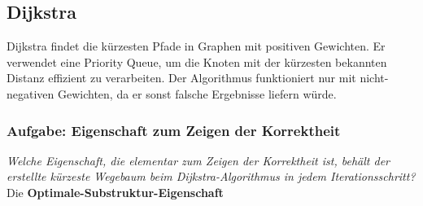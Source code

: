 \documentclass{article}
\begin{document}
\subsection{Dijkstra}
\begin{algo}[title=Dijkstra Algorithmus]
Dijkstra findet die kürzesten Pfade in Graphen mit positiven Gewichten. \newline
Er verwendet eine Priority Queue, um die Knoten mit der kürzesten bekannten Distanz effizient zu verarbeiten. Der Algorithmus funktioniert nur mit nicht-negativen Gewichten, da er sonst falsche Ergebnisse liefern würde.
\end{algo} 

\newpage
\subsubsection{Aufgabe: Eigenschaft zum Zeigen der Korrektheit \textcolor{ForestGreen}{\CheckmarkBold}}
\textit{Welche Eigenschaft, die elementar zum Zeigen der Korrektheit ist, behält der erstellte kürzeste Wegebaum beim Dijkstra-Algorithmus in jedem Iterationsschritt?} \cite{probeklausur21}\cite{probeklausur24} \newline \newline
Die \textbf{Optimale-Substruktur-Eigenschaft}

\newpage
\end{document}
